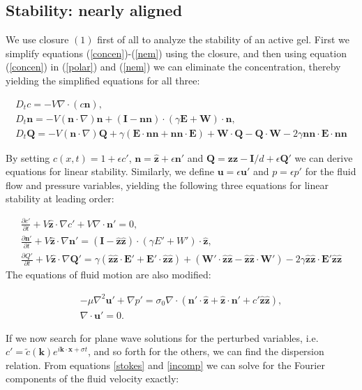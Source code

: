 \documentclass[onecolumn,showpacs,preprintnumbers,prl,amsmath,amssymb]{revtex4-1}
\def\b{\mathbf}
\begin{document}
\subsection{Stability: nearly aligned}

We use closure $(1)$ first of all to analyze the stability of an active gel. First we simplify equations (\ref{concen})-(\ref{nem}) using the closure, and then using equation (\ref{concen}) in (\ref{polar}) and (\ref{nem}) we can eliminate the concentration, thereby yielding the simplified equations for all three:

\begin{gather}
D_tc=-V\nabla\cdot(c \b{n}),\\
D_t\b{n}=-V(\b{n}\cdot\nabla)\b{n}+(\b{I}-\b{nn})\cdot(\gamma\b{E}+\b{W})\cdot\b{n},\\
D_t\b{Q}=-V(\b{n}\cdot\nabla)\b{Q}+\gamma(\b{E}\cdot\b{nn}+\b{nn}\cdot\b{E})+\b{W}\cdot\b{Q}-\b{Q}\cdot\b{W}-2\gamma\b{nn}\cdot\b{E}\cdot\b{nn}
\end{gather}

 By setting $c(x,t)=1+\epsilon c'$, $\b{n}=\b{\hat{z}}+\epsilon\b{n}'$ and $\b{Q}=\b{zz}-\b{I}/d+\epsilon \b{Q}'$ we can derive equations for linear stability. Similarly, we define $\b{u}=\epsilon \b{u}'$ and $p=\epsilon p'$ for the fluid flow and pressure variables, yielding the following three equations for linear stability at leading order:

\begin{gather}
\frac{\partial c'}{\partial t}+V\b{\hat{z}}\cdot\nabla c'+V\nabla\cdot\b{n}'=0,\\
\frac{\partial \b{n}'}{\partial t}+V\b{\hat{z}}\cdot\nabla\b{n}'=(\b{I}-\b{\hat{z}\hat{z}})\cdot(\gamma E'+W')\cdot\b{\hat{z}},\\
\frac{\partial Q'}{\partial t}+V\b{\hat{z}}\cdot\nabla\b{Q}'=\gamma(\b{\hat{z}\hat{z}}\cdot\b{E}'+\b{E}'\cdot\b{\hat{z}\hat{z}})+(\b{W}'\cdot\b{\hat{z}\hat{z}}-\b{\hat{z}\hat{z}\cdot\b{W}'})-2\gamma\b{\hat{z}\hat{z}}\cdot\b{E}'\b{\hat{z}\hat{z}}
\end{gather}
The equations of fluid motion are also modified:

\begin{gather}
\label{stokes}
-\mu\nabla^2\b{u}'+\nabla p'=\sigma_0\nabla\cdot(\b{n}'\cdot\b{\hat{z}}+\b{\hat{z}}\cdot\b{n}'+c'\b{\hat{z}\hat{z}}),\\
\label{incomp}
\nabla\cdot\b{u}'=0.
\end{gather}

If we now search for plane wave solutions for the perturbed variables, i.e. $c'=\tilde{c}(\b{k})e^{i\b{k}\cdot\b{x}+\sigma t}$, and so forth for the others, we can find the dispersion relation. From equations \ref{stokes} and \ref{incomp} we can solve for the Fourier components of the fluid velocity exactly:
\end{document}
